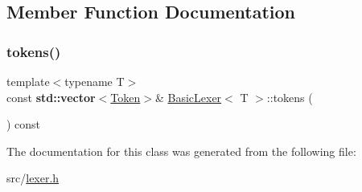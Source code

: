 \subsection{Member Function Documentation}
\mbox{\label{class_basic_lexer_a0572d78653674f48c4e1bdb6eeb31980}} 
\subsubsection{\texorpdfstring{tokens()}{tokens()}}
{\footnotesize\ttfamily template$<$typename T$>$ \\
const \textbf{ std\+::vector}$<$\hyperlink{class_token}{Token}$>$\& \hyperlink{class_basic_lexer}{Basic\+Lexer}$<$ T $>$\+::tokens (\begin{DoxyParamCaption}{ }\end{DoxyParamCaption}) const\hspace{0.3cm}{\ttfamily [inline]}}



The documentation for this class was generated from the following file\+:\begin{DoxyCompactItemize}
\item 
src/\hyperlink{lexer_8h}{lexer.\+h}\end{DoxyCompactItemize}
